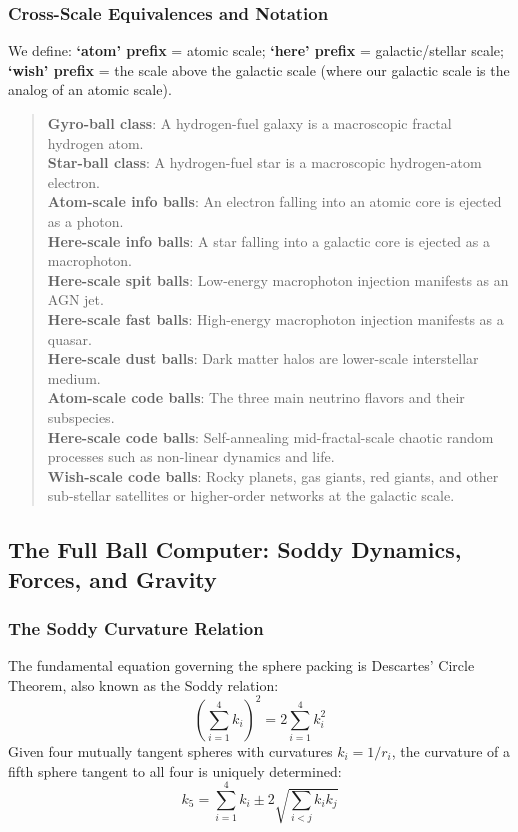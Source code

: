 \documentclass[11pt,a4paper]{article}
\begin{document}
\subsubsection{Cross-Scale Equivalences and Notation}

We define: \textbf{`atom' prefix} = atomic scale; \textbf{`here' prefix} =
galactic/stellar scale; \textbf{`wish' prefix} = the scale above the galactic
scale (where our galactic scale is the analog of an atomic scale).

\begin{quote}
\textbf{Gyro-ball class}: A hydrogen-fuel galaxy is a macroscopic fractal hydrogen atom.\\
\textbf{Star-ball class}: A hydrogen-fuel star is a macroscopic hydrogen-atom electron.\\
\textbf{Atom-scale info balls}: An electron falling into an atomic core is ejected as a photon.\\
\textbf{Here-scale info balls}: A star falling into a galactic core is ejected as a macrophoton.\\
\textbf{Here-scale spit balls}: Low-energy macrophoton injection manifests as an AGN jet.\\
\textbf{Here-scale fast balls}: High-energy macrophoton injection manifests as a quasar.\\
\textbf{Here-scale dust balls}: Dark matter halos are lower-scale interstellar medium.\\
\textbf{Atom-scale code balls}: The three main neutrino flavors and their subspecies.\\
\textbf{Here-scale code balls}: Self-annealing mid-fractal-scale chaotic random
processes such as non-linear dynamics and life.\\
\textbf{Wish-scale code balls}: Rocky planets, gas giants, red giants, and other
sub-stellar satellites or higher-order networks at the galactic scale.
\end{quote}

\subsection{The Full Ball Computer: Soddy Dynamics, Forces, and Gravity}

\subsubsection{The Soddy Curvature Relation}

The fundamental equation governing the sphere packing is Descartes' Circle
Theorem, also known as the Soddy relation:
\[
  \left(\sum_{i=1}^4 k_i\right)^2 = 2\sum_{i=1}^4 k_i^2
\]
Given four mutually tangent spheres with curvatures $k_i = 1/r_i$, the curvature
of a fifth sphere tangent to all four is uniquely determined:
\[
  k_5 = \sum_{i=1}^4 k_i \pm 2\sqrt{\sum_{i<j} k_i k_j}
\]
\end{document}
